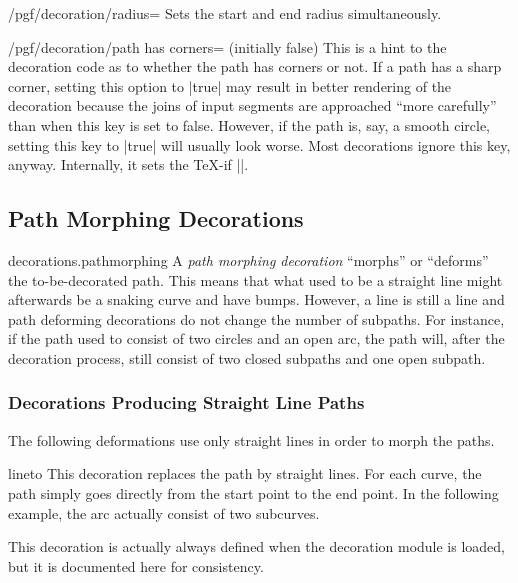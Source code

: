\begin{stylekey}{/pgf/decoration/radius=}
    Sets the start and end radius simultaneously.
\end{stylekey}

\begin{key}{/pgf/decoration/path has corners= (initially false)}
    This is a hint to the decoration code as to whether the path has corners or
    not. If a path has a sharp corner, setting this option to |true| may result
    in better rendering of the decoration because the joins of input segments
    are approached ``more carefully'' than when this key is set to false.
    However, if the path is, say, a smooth circle, setting this key to |true|
    will usually look worse. Most decorations ignore this key, anyway.
    Internally, it sets the \TeX-if |\ifpgfdecoratepathhascorners|.
\end{key}


\subsection{Path Morphing Decorations}

\begin{pgflibrary}{decorations.pathmorphing}
    A \emph{path morphing decoration} ``morphs'' or ``deforms'' the
    to-be-decorated path. This means that what used to be a straight line might
    afterwards be a snaking curve and have bumps. However, a line is still a
    line and path deforming decorations do not change the number of subpaths.
    For instance, if the path used to consist of two circles and an open arc,
    the path will, after the decoration process, still consist of two closed
    subpaths and one open subpath.
\end{pgflibrary}


\subsubsection{Decorations Producing Straight Line Paths}

The following deformations use only straight lines in order to morph the paths.

\begin{decoration}{lineto}
    This decoration replaces the path by straight lines. For each curve, the
    path simply goes directly from the start point to the end point. In the
    following example, the arc actually consist of two subcurves.

    This decoration is actually always defined when the decoration module is
    loaded, but it is documented here for consistency.
\begin{codeexample}[]
\end{codeexample}
\end{decoration}

